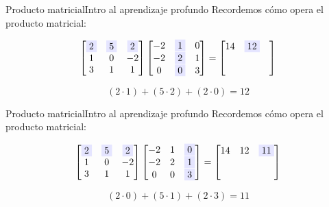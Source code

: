 \documentclass[10pt,border=3pt,tikz]{beamer}
\begin{document}
    \begin{frame}{Producto matricial}{Intro al aprendizaje profundo}
        Recordemos cómo opera el producto matricial:
        
        $$\begin{bmatrix}
            \colorbox{blue!10}{2} & \colorbox{blue!10}{5} & \colorbox{blue!10}{2}\\
            1 & 0 & -2\\
            3 & 1 & 1
        \end{bmatrix}
        \begin{bmatrix}
            -2 & \colorbox{blue!10}{1} & 0\\
            -2 & \colorbox{blue!10}{2} & 1\\
            0 & \colorbox{blue!10}{0} & 3
        \end{bmatrix} = 
        \begin{bmatrix}
            14 & \colorbox{blue!10}{12} & \\
            &  & \\
            &  & 
        \end{bmatrix}$$
        
        $$(2 \cdot 1) + (5 \cdot 2) + (2 \cdot 0) = 12$$
    \end{frame}
    
    \begin{frame}{Producto matricial}{Intro al aprendizaje profundo}
        Recordemos cómo opera el producto matricial:
        
        $$\begin{bmatrix}
            \colorbox{blue!10}{2} & \colorbox{blue!10}{5} & \colorbox{blue!10}{2}\\
            1 & 0 & -2\\
            3 & 1 & 1
        \end{bmatrix}
        \begin{bmatrix}
        -2 & 1 & \colorbox{blue!10}{0}\\
        -2 & 2 & \colorbox{blue!10}{1}\\
        0 & 0 & \colorbox{blue!10}{3}
        \end{bmatrix} = 
        \begin{bmatrix}
            14 & 12 & \colorbox{blue!10}{11}\\
            &  & \\
            &  & 
        \end{bmatrix}$$
        
        $$(2 \cdot 0) + (5 \cdot 1) + (2 \cdot 3) = 11$$
    \end{frame}
    
\end{document}
